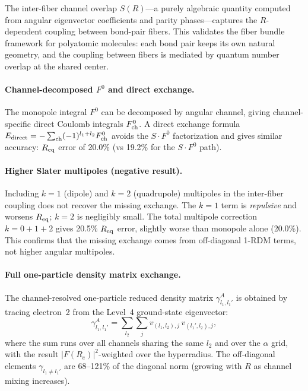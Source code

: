 \documentclass[aps,pra,twocolumn,superscriptaddress,longbibliography,floatfix]{revtex4-2}
\begin{document}
The inter-fiber channel overlap $S(R)$---a purely algebraic quantity
computed from angular eigenvector coefficients and parity
phases---captures the $R$-dependent coupling between bond-pair fibers.
This validates the fiber bundle framework for polyatomic molecules:
each bond pair keeps its own natural geometry, and the coupling between
fibers is mediated by quantum number overlap at the shared center.

\paragraph{Channel-decomposed $F^0$ and direct exchange.}
The monopole integral $F^0$ can be decomposed by angular channel,
giving channel-specific direct Coulomb integrals $F^0_{\rm ch}$.
A direct exchange formula
$E_{\rm direct} = -\sum_{\rm ch} (-1)^{l_1 + l_2} F^0_{\rm ch}$
avoids the $S \cdot F^0$ factorization and gives similar accuracy:
$R_{\rm eq}$ error of 20.0\% (vs 19.2\% for the $S \cdot F^0$ path).

\paragraph{Higher Slater multipoles (negative result).}
Including $k = 1$ (dipole) and $k = 2$ (quadrupole) multipoles in
the inter-fiber coupling does not recover the missing exchange.
The $k = 1$ term is \emph{repulsive} and worsens $R_{\rm eq}$;
$k = 2$ is negligibly small.  The total multipole correction
$k = 0 + 1 + 2$ gives 20.5\% $R_{\rm eq}$ error, slightly worse
than monopole alone (20.0\%).  This confirms that the missing
exchange comes from off-diagonal 1-RDM terms, not higher angular
multipoles.

\paragraph{Full one-particle density matrix exchange.}
The channel-resolved one-particle reduced density matrix
$\gamma^A_{l_1, l_1'}$ is obtained by tracing electron~2 from the
Level~4 ground-state eigenvector:
\begin{equation}
  \gamma^A_{l_1, l_1'}
    = \sum_{l_2} \sum_j v_{(l_1, l_2), j}\, v_{(l_1', l_2), j},
\end{equation}
where the sum runs over all channels sharing the same $l_2$ and
over the $\alpha$ grid, with the result $|F(R_e)|^2$-weighted
over the hyperradius.  The off-diagonal elements
$\gamma_{l_1 \ne l_1'}$ are 68--121\% of the diagonal norm
(growing with $R$ as channel mixing increases).
\end{document}
